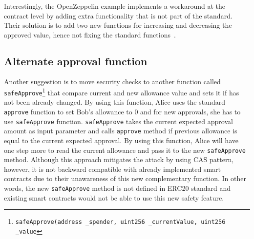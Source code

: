 Interestingly, the OpenZeppelin example implements a workaround at the contract level by adding extra functionality that is not part of the standard. Their solution is to add two new functions for increasing and decreasing the approved value, hence not fixing the standard functions~\cite{Ref10}.

\subsection{Alternate approval function}
Another suggestion\cite{Ref16} is to move security checks to another function called \texttt{safeApprove}\footnote{\texttt{safeApprove(address \_spender, uint256 \_currentValue, uint256 \_value}} that compare current and new allowance value and sets it if has not been already changed. By using this function, Alice uses the standard \texttt{approve} function to set Bob’s allowance to 0 and for new approvals, she has to use \texttt{safeApprove} function. \texttt{safeApprove} takes the current expected approval amount as input parameter and calls \texttt{approve} method if previous allowance is equal to the current expected approval. By using this function, Alice will have one step more to read the current allowance and pass it to the new \texttt{safeApprove} method. Although this approach mitigates the attack by using CAS pattern\cite{Ref06}, however, it is not backward compatible with already implemented smart contracts due to their unawareness of this new complementary function. In other words, the new \texttt{safeApprove} method is not defined in ERC20 standard and existing smart contracts would not be able to use this new safety feature.

